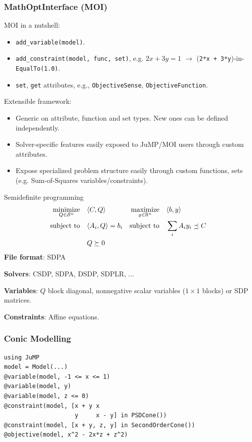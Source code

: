 \documentclass{beamer}
\begin{document}
  \begin{frame}[fragile]
    \frametitle{MathOptInterface (MOI)}
    MOI in a nutshell:
    \begin{itemize}
      \item \verb|add_variable(model)|.
      \item \verb|add_constraint(model, func, set)|, e.g. $2x + 3y = 1$ $\to$ (\verb|2*x + 3*y|)-in-\verb|EqualTo(1.0)|.
      \item \verb|set|, \verb|get| attributes, e.g., \verb|ObjectiveSense|, \verb|ObjectiveFunction|.
    \end{itemize}
    Extensible framework:
    \begin{itemize}
      \item \alert{Generic} on attribute, function and set types. New ones can be defined \alert{independently}.
      \item Solver-\alert{specific} features easily exposed to JuMP/MOI users through \alert{custom} attributes.
      \item Expose \alert{specialized} problem structure easily through \alert{custom} functions, sets (e.g. Sum-of-Squares variables/constraints).
    \end{itemize}
  \end{frame}

  \begin{frame}{Semidefinite programming}
    \begin{align*}
      \operatorname*{minimize}_{Q \in \mathcal{S}^n} \quad & \langle C, Q \rangle & \operatorname*{maximize}_{y \in \mathbb{R}^n} \quad & \langle b, y \rangle\\
      \operatorname*{\operatorname*{\text{subject to}}\quad} & \langle A_i, Q \rangle = b_i & \operatorname*{\operatorname*{\text{subject to}}\quad} & \sum_i A_i y_i \preceq C\\
        & Q \succeq 0
    \end{align*}
    \textbf{File format}: SDPA

    \textbf{Solvers}: CSDP, SDPA, DSDP, SDPLR, ...

    \textbf{Variables}: $Q$ block diagonal, nonnegative scalar variables ($1 \times 1$ blocks) or SDP matrices.

    \textbf{Constraints}: Affine equations.
  \end{frame}

  \begin{frame}[fragile]
    \frametitle{Conic Modelling}
\begin{verbatim}
using JuMP
model = Model(...)
@variable(model, -1 <= x <= 1)
@variable(model, y)
@variable(model, z <= 0)
@constraint(model, [x + y x
                    y     x - y] in PSDCone())
@constraint(model, [x + y, z, y] in SecondOrderCone())
@objective(model, x^2 - 2x*z + z^2)
\end{verbatim}
  \end{frame}
\end{document}
